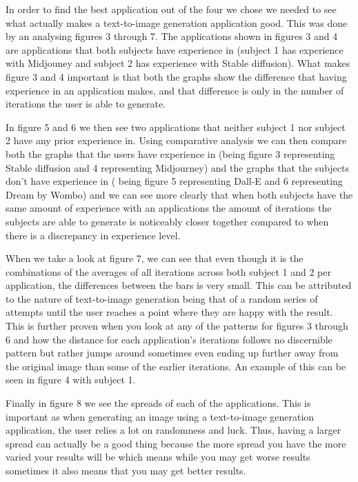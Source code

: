\documentclass[]{report}
\begin{document}
	In order to find the best application out of the four we chose we needed to see what actually makes a text-to-image generation application good. This was done by an analysing figures 3 through 7. The applications shown in figures 3 and 4 are applications that both subjects have experience in (subject 1 has experience with Midjouney and subject 2 has experience with Stable diffusion). What makes figure 3 and 4 important is that both the graphs show the difference that having experience in an application makes, and that difference is only in the number of iterations the user is able to generate. 
	
	
	
	In figure 5 and 6 we then see two applications that neither subject 1 nor subject 2 have any prior experience in. Using comparative analysis we can then compare both the graphs that the users have experience in (being figure 3 representing Stable diffusion and 4 representing Midjourney) and the graphs that the subjects don't have experience in ( being figure 5 representing Dall-E and 6 representing Dream by Wombo) and we can see more clearly that when both subjects have the same amount of experience with an applications the amount of iterations the subjects are able to generate is noticeably closer together compared to when there is a discrepancy in experience level. 
	
	
	
	When we take a look at figure 7, we can see that even though it is the combinations of the averages of all iterations across both subject 1 and 2 per application, the differences between the bars is very small. This can be attributed to the nature of text-to-image generation being that of a random series of attempts until the user reaches a point where they are happy with the result. This is further proven when you look at any of the patterns for figures 3 through 6 and how the distance for each application's iterations follows no discernible pattern but rather jumps around sometimes even ending up further away from the original image than some of the earlier iterations. An example of this can be seen in figure 4 with subject 1.
	
	Finally in figure 8 we see the spreads of each of the applications. This is important as when generating an image using a text-to-image generation application, the user relies a lot on randomness and luck. Thus, having a larger spread can actually be a good thing because the more spread you have the more varied your results will be which means while you may get worse results sometimes it also means that you may get better results.
	
\end{document}
